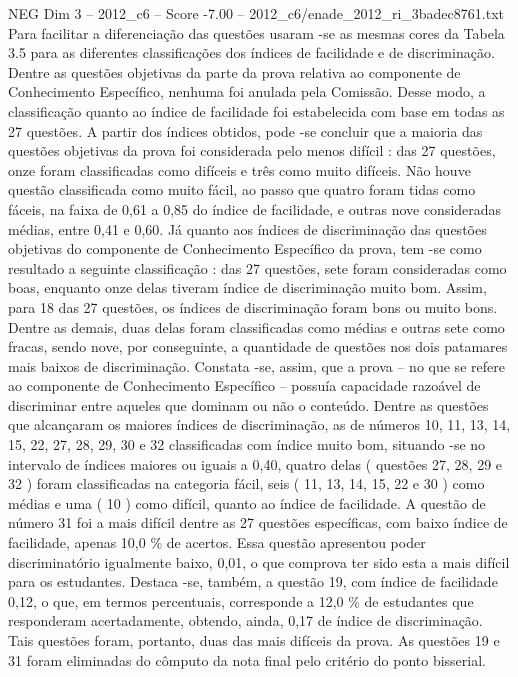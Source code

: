\begin{textsample}{NEG Dim 3 – 2012\_c6 – Score -7.00 – 2012\_c6/enade\_2012\_ri\_3badec8761.txt}
Para facilitar a diferenciação das questões usaram -se as mesmas cores da Tabela 3.5 para as diferentes classificações dos índices de facilidade e de discriminação.
Dentre as questões objetivas da parte da prova relativa ao componente de Conhecimento Específico, nenhuma foi anulada pela Comissão.
Desse modo, a classificação quanto ao índice de facilidade foi estabelecida com base em todas as 27 questões.
A partir dos índices obtidos, pode -se concluir que a maioria das questões objetivas da prova foi considerada pelo menos difícil : das 27 questões, onze foram classificadas como difíceis e três como muito difíceis.
Não houve questão classificada como muito fácil, ao passo que quatro foram tidas como fáceis, na faixa de 0,61 a 0,85 do índice de facilidade, e outras nove consideradas médias, entre 0,41 e 0,60.
Já quanto aos índices de discriminação das questões objetivas do componente de Conhecimento Específico da prova, tem -se como resultado a seguinte classificação : das 27 questões, sete foram consideradas como boas, enquanto onze delas tiveram índice de discriminação muito bom.
Assim, para 18 das 27 questões, os índices de discriminação foram bons ou muito bons.
Dentre as demais, duas delas foram classificadas como médias e outras sete como fracas, sendo nove, por conseguinte, a quantidade de questões nos dois patamares mais baixos de discriminação.
Constata -se, assim, que a prova – no que se refere ao componente de Conhecimento Específico – possuía capacidade razoável de discriminar entre aqueles que dominam ou não o conteúdo.
Dentre as questões que alcançaram os maiores índices de discriminação, as de números 10, 11, 13, 14, 15, 22, 27, 28, 29, 30 e 32 classificadas com índice muito bom, situando -se no intervalo de índices maiores ou iguais a 0,40, quatro delas ( questões 27, 28, 29 e 32 ) foram classificadas na categoria fácil, seis ( 11, 13, 14, 15, 22 e 30 ) como médias e uma ( 10 ) como difícil, quanto ao índice de facilidade.
A questão de número 31 foi a mais difícil dentre as 27 questões específicas, com baixo índice de facilidade, apenas 10,0 \% de acertos.
Essa questão apresentou poder discriminatório igualmente baixo, 0,01, o que comprova ter sido esta a mais difícil para os estudantes.
Destaca -se, também, a questão 19, com índice de facilidade 0,12, o que, em termos percentuais, corresponde a 12,0 \% de estudantes que responderam acertadamente, obtendo, ainda, 0,17 de índice de discriminação.
Tais questões foram, portanto, duas das mais difíceis da prova.
As questões 19 e 31 foram eliminadas do cômputo da nota final pelo critério do ponto bisserial.

\end{textsample}
